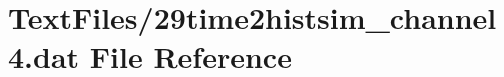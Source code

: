\hypertarget{29time2histsim__channel4_8dat}{}\section{Text\+Files/29time2histsim\+\_\+channel4.dat File Reference}
\label{29time2histsim__channel4_8dat}
